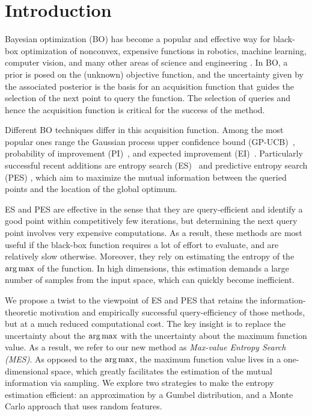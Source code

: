 \section{Introduction}

Bayesian optimization (BO) has become a popular and effective way for black-box optimization of nonconvex, expensive functions in robotics, machine learning, computer vision, and many other areas of science and engineering \citep{brochu2009,calandra2014experimental,krause2011contextual,lizotte2007,snoek2012practical,thornton13,wang17icra}. In BO, a prior is posed on the (unknown) objective function, and the uncertainty given by the associated posterior is the basis for an acquisition function that guides the selection of the next point to query the function. The selection of queries and hence the acquisition function is critical for the success of the method.

Different BO techniques differ in this acquisition function. Among the most popular ones range the Gaussian process upper confidence bound (GP-UCB)~\cite{auer2002b,srinivas2009gaussian}, probability of improvement (PI)~\cite{kushner1964}, and expected improvement (EI)~\cite{mockus1974}. Particularly successful recent additions are entropy search (ES)~\cite{hennig2012} and predictive entropy search (PES) \cite{hernandez2014predictive}, which aim to maximize the mutual information between the queried points and the location of the global optimum.

ES and PES are effective in the sense that they are query-efficient and identify a good point within competitively few iterations, but determining the next query point involves very expensive computations. As a result, these methods are most useful if the black-box function requires a lot of effort to evaluate, and are relatively slow otherwise. Moreover, they rely on estimating the entropy of the $\operatorname{arg\,max}$ of the function. In high dimensions, this estimation demands a large number of samples from the input space, which can quickly become inefficient.

We propose a twist to the viewpoint of ES and PES that retains the information-theoretic motivation and empirically successful query-efficiency of those methods, but at a much reduced computational cost. The key insight is to replace the uncertainty about the $\operatorname{arg\,max}$ with the uncertainty about the maximum function value. As a result, we refer to our new method as \emph{Max-value Entropy Search (MES)}. As opposed to the $\operatorname{arg\,max}$, the maximum function value lives in a one-dimensional space, which greatly facilitates the estimation of the mutual information via sampling. We explore two strategies to make the entropy estimation efficient: an approximation by a Gumbel distribution, and a Monte Carlo approach that uses random features. 

